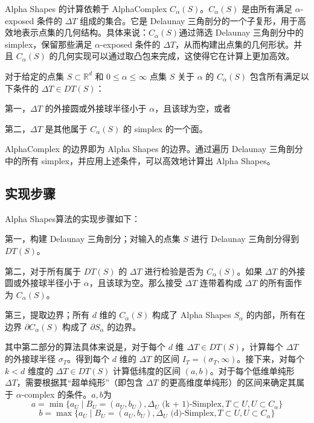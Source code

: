 \documentclass{xduugthesis}
\begin{document}
Alpha Shapes 的计算依赖于 AlphaComplex \( C_\alpha(S) \)。\( C_\alpha(S) \) 是由所有满足 \( \alpha \)-exposed 条件的 \( \Delta T \) 组成的集合。它是 Delaunay 三角剖分的一个子复形，用于高效地表示点集的几何结构。具体来说：\( C_\alpha(S) \)通过筛选 Delaunay 三角剖分中的 simplex，保留那些满足 \( \alpha \)-exposed 条件的 \( \Delta T \)，从而构建出点集的几何形状。并且 \( C_\alpha(S) \) 的几何实现可以通过取凸包来完成，这使得它在计算上更加高效。

对于给定的点集 \( S \subset \mathbb{R}^d \) 和 \( 0 \leq \alpha \leq \infty \) 点集 \( S \) 关于 \( \alpha \) 的 \( C_\alpha(S) \) 包含所有满足以下条件的 \( \Delta T \in DT(S) \)：

第一，\( \Delta T \) 的外接圆或外接球半径小于 \( \alpha \)，且该球为空，或者

第二，\( \Delta T \) 是其他属于 \( C_\alpha(S) \) 的 simplex 的一个面。

AlphaComplex 的边界即为 Alpha Shapes 的边界。通过遍历 Delaunay 三角剖分中的所有 simplex，并应用上述条件，可以高效地计算出 Alpha Shapes。
\subsection{实现步骤}
Alpha Shapes算法的实现步骤如下：

第一，构建 Delaunay 三角剖分；对输入的点集 \( S \) 进行 Delaunay 三角剖分得到 \( DT(S) \)。

第二，对于所有属于 \( DT(S) \) 的 \( \Delta T \) 进行检验是否为 \( C_\alpha(S) \)。如果 \( \Delta T \) 的外接圆或外接球半径小于 \( \alpha \)，且该球为空。那么接受 \( \Delta T \) 连带着构成 \( \Delta T \) 的所有面作为 \( C_\alpha(S) \)。

第三，提取边界；所有 \( d \) 维的 \( C_\alpha(S) \) 构成了 Alpha Shapes \( S_\alpha \) 的内部，所有在边界 \( \partial C_\alpha(S) \) 构成了 \( \partial S_\alpha \) 的边界。

其中第二部分的算法具体来说是，对于每个 \( d \) 维 \( \Delta T \in DT(S) \)，计算每个 \( \Delta T \) 的外接球半径 \( \sigma_T \)。得到每个 \( d \) 维的 \( \Delta T \) 的区间 \( I_T = (\sigma_T, \infty) \)。接下来，对每个 \( k < d \) 维度的 \( \Delta T \in DT(S) \) 计算低纬度的区间 \( (a, b) \)。对于每个低维单纯形 \( \Delta T \)，需要根据其“超单纯形”（即包含 \( \Delta T \) 的更高维度单纯形）的区间来确定其属于 \( \alpha \)-complex 的条件。\(a, b\)为
\begin{equation}
a = \min \{a_U \mid B_U = (a_U, b_U), \Delta_U \text{ (k + 1)-Simplex}, T \subset U, U \subset C_\alpha\}
\end{equation}
\begin{equation}
b = \max \{a_U \mid B_U = (a_U, b_U), \Delta_U \text{ (d)-Simplex}, T \subset U, U \subset C_\alpha\}
\end{equation}
\end{document}
